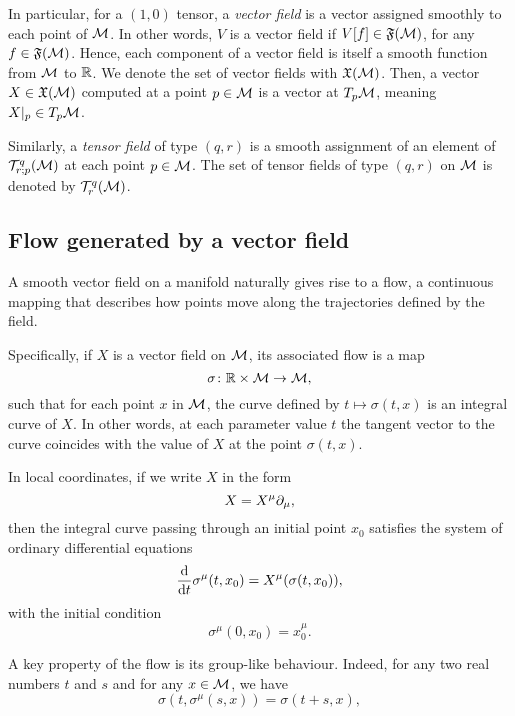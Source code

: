 In particular, for a $(1,0)$ tensor, a \emph{vector field} is a vector assigned smoothly to each point of $\mathcal{M}$. In other words, $V$ is a vector field if $V[f] \in \mathfrak{F}(\mathcal{M})$, for any $f \in \mathfrak{F}(\mathcal{M})$. Hence, each component of a vector field is itself a smooth function from $\mathcal{M}$ to $\mathbb{R}$. We denote the set of vector fields with $\mathfrak{X}(\mathcal{M})$. Then, a vector $X \in \mathfrak{X}(\mathcal{M})$ computed at a point $p \in \mathcal{M}$ is a vector at $T_p \mathcal{M}$, meaning $X|_p \in T_p \mathcal{M}$.

Similarly, a \emph{tensor field} of type $(q,r)$ is a smooth assignment of an element of $\mathcal{T}^q_{r;p}(\mathcal{M})$ at each point $p \in \mathcal{M}$. The set of tensor fields of type $(q,r)$ on $\mathcal{M}$ is denoted by $\mathcal{T}^q_r(\mathcal{M})$.

\subsection{Flow generated by a vector field}
A smooth vector field on a manifold naturally gives rise to a flow, a continuous mapping that describes how points move along the trajectories defined by the field.

Specifically, if $X$ is a vector field on $\mathcal{M}$, its associated flow is a map
\begin{equation}
    \sigma \colon \mathbb{R} \times \mathcal{M} \to \mathcal{M},
\end{equation}
such that for each point $x$ in $\mathcal{M}$, the curve defined by $t \mapsto \sigma(t, x)$ is an integral curve of $X$. In other words, at each parameter value $t$ the tangent vector to the curve coincides with the value of $X$ at the point $\sigma(t,x)$.

In local coordinates, if we write $X$ in the form
\begin{equation}
    X = X^\mu \partial_\mu,
\end{equation}
then the integral curve passing through an initial point $x_0$ satisfies the system of ordinary differential equations
\begin{equation}\label{eq:ode-flow-coordinates}
	\frac{\mathop{}\!\mathrm{d}}{\mathop{}\!\mathrm{d} t} \sigma^\mu (t,x_0) = X^\mu (\sigma(t,x_0)),
\end{equation}
with the initial condition
\begin{equation}\label{eq:ode-flow-initial-condition}
	\sigma^\mu(0,x_0) = x^\mu_0.
\end{equation}

A key property of the flow is its group-like behaviour. Indeed, for any two real numbers $t$ and $s$ and for any $x\in\mathcal{M}$, we have
\begin{equation}\label{eq:property-flow}
	\sigma(t, \sigma^\mu(s,x)) = \sigma(t+s,x),
\end{equation}

